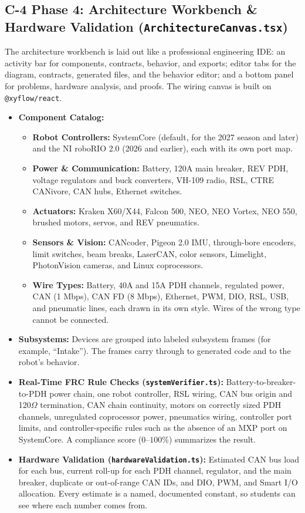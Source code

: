 \documentclass[11pt,letterpaper]{article}
\begin{document}
\needspace{6cm}
\subsection*{\normalsize {C-4 Phase 4: Architecture Workbench \& Hardware Validation (\texttt{ArchitectureCanvas.tsx})}}\label{sec:C4}
The architecture workbench is laid out like a professional engineering IDE: an activity bar for components, contracts, behavior, and exports; editor tabs for the diagram, contracts, generated files, and the behavior editor; and a bottom panel for problems, hardware analysis, and proofs. The wiring canvas is built on \texttt{@xyflow/react}.

\begin{itemize}
    \item \textbf{Component Catalog:}
    \begin{itemize}
        \item \textbf{Robot Controllers:} SystemCore (default, for the 2027 season and later) and the NI roboRIO 2.0 (2026 and earlier), each with its own port map.
        \item \textbf{Power \& Communication:} Battery, 120A main breaker, REV PDH, voltage regulators and buck converters, VH-109 radio, RSL, CTRE CANivore, CAN hubs, Ethernet switches.
        \item \textbf{Actuators:} Kraken X60/X44, Falcon 500, NEO, NEO Vortex, NEO 550, brushed motors, servos, and REV pneumatics.
        \item \textbf{Sensors \& Vision:} CANcoder, Pigeon 2.0 IMU, through-bore encoders, limit switches, beam breaks, LaserCAN, color sensors, Limelight, PhotonVision cameras, and Linux coprocessors.
        \item \textbf{Wire Types:} Battery, 40A and 15A PDH channels, regulated power, CAN (1 Mbps), CAN FD (8 Mbps), Ethernet, PWM, DIO, RSL, USB, and pneumatic lines, each drawn in its own style. Wires of the wrong type cannot be connected.
    \end{itemize}
    \item \textbf{Subsystems:} Devices are grouped into labeled subsystem frames (for example, ``Intake''). The frames carry through to generated code and to the robot's behavior.
    \item \textbf{Real-Time FRC Rule Checks (\texttt{systemVerifier.ts}):} Battery-to-breaker-to-PDH power chain, one robot controller, RSL wiring, CAN bus origin and 120$\Omega$ termination, CAN chain continuity, motors on correctly sized PDH channels, unregulated coprocessor power, pneumatics wiring, controller port limits, and controller-specific rules such as the absence of an MXP port on SystemCore. A compliance score ($0$--$100\%$) summarizes the result.
    \item \textbf{Hardware Validation (\texttt{hardwareValidation.ts}):} Estimated CAN bus load for each bus, current roll-up for each PDH channel, regulator, and the main breaker, duplicate or out-of-range CAN IDs, and DIO, PWM, and Smart I/O allocation. Every estimate is a named, documented constant, so students can see where each number comes from.
\end{itemize}
\end{document}
